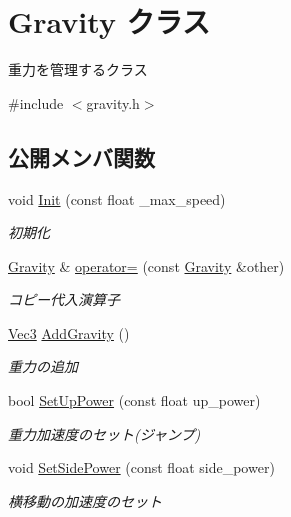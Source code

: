 \hypertarget{class_gravity}{}\section{Gravity クラス}
\label{class_gravity}


重力を管理するクラス  




{\ttfamily \#include $<$gravity.\+h$>$}

\subsection*{公開メンバ関数}
\begin{DoxyCompactItemize}
\item 
void \mbox{\hyperlink{class_gravity_acd4190d806a404342bbb49031e47b7b6}{Init}} (const float \+\_\+max\+\_\+speed)
\begin{DoxyCompactList}\small\item\em 初期化 \end{DoxyCompactList}\item 
\mbox{\hyperlink{class_gravity}{Gravity}} \& \mbox{\hyperlink{class_gravity_a68162c6452cad9eef17c6688266023c0}{operator=}} (const \mbox{\hyperlink{class_gravity}{Gravity}} \&other)
\begin{DoxyCompactList}\small\item\em コピー代入演算子 \end{DoxyCompactList}\item 
\mbox{\hyperlink{common_8h_ab1cb35b3a17c398d8ef71d5f779808bf}{Vec3}} \mbox{\hyperlink{class_gravity_aaa4ff8499bad48efebed909ab16b6dfa}{Add\+Gravity}} ()
\begin{DoxyCompactList}\small\item\em 重力の追加 \end{DoxyCompactList}\item 
bool \mbox{\hyperlink{class_gravity_ace00a42ac3fc74608e77cffa7f39baae}{Set\+Up\+Power}} (const float up\+\_\+power)
\begin{DoxyCompactList}\small\item\em 重力加速度のセット(ジャンプ) \end{DoxyCompactList}\item 
void \mbox{\hyperlink{class_gravity_a76503b3788b696748828f6e48556b9ab}{Set\+Side\+Power}} (const float side\+\_\+power)
\begin{DoxyCompactList}\small\item\em 横移動の加速度のセット \end{DoxyCompactList}\item 

\end{DoxyCompactItemize}
